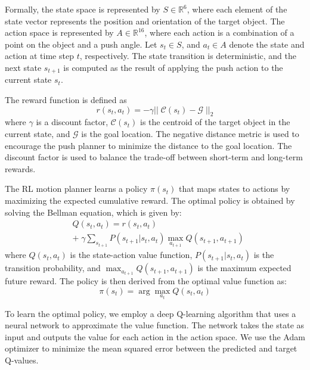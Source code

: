 Formally, the state space is represented by $S \in \mathbb{R}^{6}$, where each element of the state vector represents the position and orientation of the target object. The action space is represented by $A \in \mathbb{R}^{16}$, where each action is a combination of a point on the object and a push angle. Let $s_t \in S$, and $a_t \in A$ denote the state and action at time step $t$, respectively. The state transition is deterministic, and the next state $s_{t+1}$ is computed as the result of applying the push action to the current state $s_t$.

The reward function is defined as 
\begin{equation}
r(s_t, a_t) = -\gamma ||\; \mathcal{C}(s_t) - \mathcal{G}\; ||_2
\end{equation}
where $\gamma$ is a discount factor, $\mathcal{C}(s_t)$ is the centroid of the target object in the current state, and $\mathcal{G}$ is the goal location. The negative distance metric is used to encourage the push planner to minimize the distance to the goal location. The discount factor is used to balance the trade-off between short-term and long-term rewards.

The RL motion planner learns a policy $\pi(s_t)$ that maps states to actions by maximizing the expected cumulative reward. The optimal policy is obtained by solving the Bellman equation, which is given by:
\begin{equation}
\begin{aligned}
    &Q(s_t, a_t) = r(s_t, a_t) \\
    &+\; \gamma \sum_{s_{t+1}} P(s_{t+1}|s_t,a_t) \max_{a_{t+1}} Q(s_{t+1}, a_{t+1})
\end{aligned}
\end{equation}
where $Q(s_t, a_t)$ is the state-action value function, $P(s_{t+1}|s_t,a_t)$ is the transition probability, and $\max_{a_{t+1}} Q(s_{t+1}, a_{t+1})$ is the maximum expected future reward. The policy is then derived from the optimal value function as:
\begin{equation}
    \pi(s_t) = \arg\max_{a_t} Q(s_t, a_t)
\end{equation}

To learn the optimal policy, we employ a deep Q-learning algorithm that uses a neural network to approximate the value function. The network takes the state as input and outputs the value for each action in the action space. We use the Adam optimizer to minimize the mean squared error between the predicted and target Q-values.

